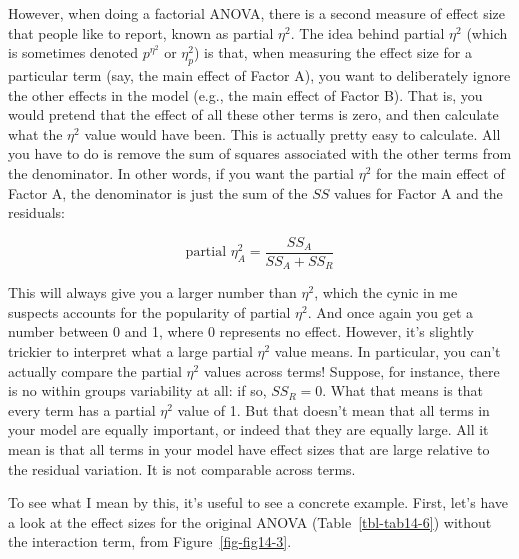 \documentclass[
  a4paper,
]{book}
\begin{document}
However, when doing a factorial ANOVA, there is a second measure of
effect size that people like to report, known as partial \(\eta^2\). The
idea behind partial \(\eta^2\) (which is sometimes denoted
\(p^{\eta^2}\) or \(\eta_p^2\)) is that, when measuring the effect size
for a particular term (say, the main effect of Factor A), you want to
deliberately ignore the other effects in the model (e.g., the main
effect of Factor B). That is, you would pretend that the effect of all
these other terms is zero, and then calculate what the \(\eta^2\) value
would have been. This is actually pretty easy to calculate. All you have
to do is remove the sum of squares associated with the other terms from
the denominator. In other words, if you want the partial \(\eta^2\) for
the main effect of Factor A, the denominator is just the sum of the
\(SS\) values for Factor A and the residuals:

\[\text{partial }\eta_A^2= \frac{SS_A}{SS_A+SS_R}\]

This will always give you a larger number than \(\eta^2\), which the
cynic in me suspects accounts for the popularity of partial \(\eta^2\).
And once again you get a number between 0 and 1, where 0 represents no
effect. However, it's slightly trickier to interpret what a large
partial \(\eta^2\) value means. In particular, you can't actually
compare the partial \(\eta^2\) values across terms! Suppose, for
instance, there is no within groups variability at all: if so,
\(SS_R = 0\). What that means is that every term has a partial
\(\eta^2\) value of 1. But that doesn't mean that all terms in your
model are equally important, or indeed that they are equally large. All
it mean is that all terms in your model have effect sizes that are large
relative to the residual variation. It is not comparable across terms.

To see what I mean by this, it's useful to see a concrete example.
First, let's have a look at the effect sizes for the original ANOVA
(Table~\ref{tbl-tab14-6}) without the interaction term, from
Figure~\ref{fig-fig14-3}.

\hypertarget{tbl-tab14-6}{}
 
  \providecommand{\huxb}[2]{\arrayrulecolor[RGB]{#1}\global\arrayrulewidth=#2pt}
  \providecommand{\huxvb}[2]{\color[RGB]{#1}\vrule width #2pt}
  \providecommand{\huxtpad}[1]{\rule{0pt}{#1}}
  \providecommand{\huxbpad}[1]{\rule[-#1]{0pt}{#1}}
\end{document}
